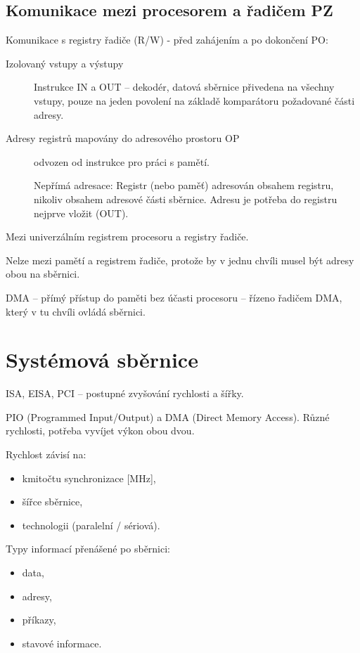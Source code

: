 \documentclass[a4paper, 11pt]{report}
\begin{document}
\subsection{Komunikace mezi procesorem a  řadičem PZ}

Komunikace s registry řadiče (R/W) - před zahájením a po dokončení PO:
\begin{description}
	\item[Izolovaný vstupy a výstupy] Instrukce IN a OUT -- dekodér, datová sběrnice přivedena na všechny vstupy, pouze na jeden povolení na základě komparátoru požadované části adresy. 
	\item[Adresy registrů mapovány do adresového prostoru OP]  odvozen od instrukce pro práci s pamětí.
	
	Nepřímá adresace: Registr (nebo paměť) adresován obsahem registru, nikoliv obsahem adresové části sběrnice. Adresu je potřeba do registru nejprve vložit (OUT).
\end{description}


Mezi univerzálním registrem procesoru a registry řadiče.

Nelze mezi pamětí a registrem řadiče, protože by v jednu chvíli musel být adresy obou na sběrnici.

DMA -- přímý přístup do paměti bez účasti procesoru -- řízeno řadičem DMA, který v tu chvíli ovládá sběrnici.

\section{Systémová sběrnice}

ISA, EISA, PCI -- postupné zvyšování rychlosti a šířky.

PIO (Programmed Input/Output) a DMA (Direct Memory Access). Různé rychlosti, potřeba vyvíjet výkon obou dvou.

Rychlost závisí na:
\begin{itemize}
	\item kmitočtu synchronizace [MHz],
	\item šířce sběrnice,
	\item technologii (paralelní / sériová).
\end{itemize}

Typy informací přenášené po sběrnici:
\begin{itemize}
	\item data,
	\item adresy,
	\item příkazy,
	\item stavové informace.
\end{itemize}
\end{document}
